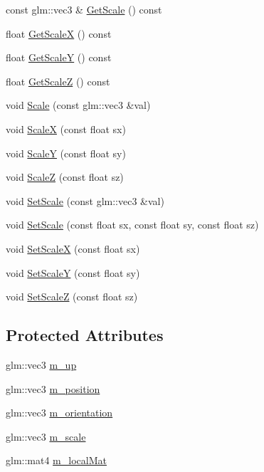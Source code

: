 \begin{DoxyCompactItemize}
\item 
const glm\+::vec3 \& \mbox{\hyperlink{classec_1_1_transform3_d_a8819e33e87e8a8cf0086c156b0072a4d}{Get\+Scale}} () const
\item 
float \mbox{\hyperlink{classec_1_1_transform3_d_a34c610a94a2802100447d053a7866b85}{Get\+ScaleX}} () const
\item 
float \mbox{\hyperlink{classec_1_1_transform3_d_abfa421cde566209e669eba461cdafb16}{Get\+ScaleY}} () const
\item 
float \mbox{\hyperlink{classec_1_1_transform3_d_ae4c302baa33386b27eecb1cd4c627573}{Get\+ScaleZ}} () const
\item 
void \mbox{\hyperlink{classec_1_1_transform3_d_a6f6909d1f35cc5c4d4340e6fe56d5e4d}{Scale}} (const glm\+::vec3 \&val)
\item 
void \mbox{\hyperlink{classec_1_1_transform3_d_a17289ae542625db691f2d4944c8213fb}{ScaleX}} (const float sx)
\item 
void \mbox{\hyperlink{classec_1_1_transform3_d_a8b85b17f0879d8f5f0f14746d6a13f51}{ScaleY}} (const float sy)
\item 
void \mbox{\hyperlink{classec_1_1_transform3_d_aabfade728cf9193d14ab5e726c8ddd0f}{ScaleZ}} (const float sz)
\item 
void \mbox{\hyperlink{classec_1_1_transform3_d_ac60d767a4f53241ef68726530da0b984}{Set\+Scale}} (const glm\+::vec3 \&val)
\item 
void \mbox{\hyperlink{classec_1_1_transform3_d_ac3a8b4e7a97700c4761bfadbd6a6b9ec}{Set\+Scale}} (const float sx, const float sy, const float sz)
\item 
void \mbox{\hyperlink{classec_1_1_transform3_d_ae846994da07971f9d56b33d29cd65088}{Set\+ScaleX}} (const float sx)
\item 
void \mbox{\hyperlink{classec_1_1_transform3_d_a2fc713c7032ef473b7c6cc73e323e54f}{Set\+ScaleY}} (const float sy)
\item 
void \mbox{\hyperlink{classec_1_1_transform3_d_a7e6dcd189fb5e4300e63a6eaeb20eece}{Set\+ScaleZ}} (const float sz)
\end{DoxyCompactItemize}
\subsection*{Protected Attributes}
\begin{DoxyCompactItemize}
\item 
glm\+::vec3 \mbox{\hyperlink{classec_1_1_transform3_d_addd1132fb57befe841dfd9af94aa4329}{m\+\_\+up}}
\item 
glm\+::vec3 \mbox{\hyperlink{classec_1_1_transform3_d_a5bba8c29bb22d2b122b64b51b52335f7}{m\+\_\+position}}
\item 
glm\+::vec3 \mbox{\hyperlink{classec_1_1_transform3_d_aef0dbda6a07519263c5ad7e617bec33c}{m\+\_\+orientation}}
\item 
glm\+::vec3 \mbox{\hyperlink{classec_1_1_transform3_d_a8eb8cecaa5ec8273e49c9487e0f6b935}{m\+\_\+scale}}
\item 
glm\+::mat4 \mbox{\hyperlink{classec_1_1_transform3_d_a3db99e0bf5af6dcbd68d18badcbf615e}{m\+\_\+local\+Mat}}
\end{DoxyCompactItemize}


